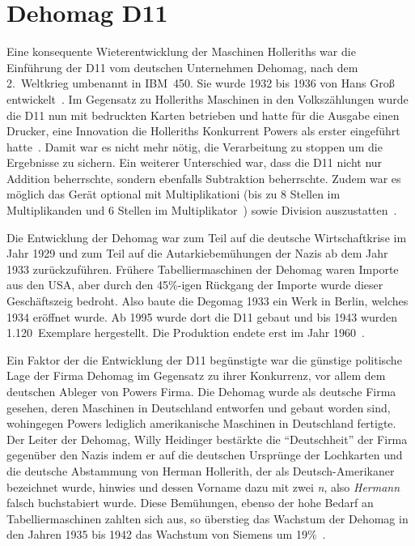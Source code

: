 \documentclass[parskip=half]{scrartcl}
\begin{document}
\section{Dehomag D11}
\label{sec:d11}

Eine konsequente Wieterentwicklung der Maschinen Holleriths war die Einführung
der D11 vom deutschen Unternehmen Dehomag, nach dem 2.~Weltkrieg umbenannt in
IBM~450. Sie wurde 1932 bis 1936 von Hans Groß
entwickelt~\cite{deutschesMuseum}. Im Gegensatz zu Holleriths Maschinen in den
Volkszählungen wurde die D11 nun mit bedruckten Karten betrieben und hatte für
die Ausgabe einen Drucker, eine Innovation die Holleriths Konkurrent Powers als
erster eingeführt hatte~\cite{austrian1982herman}. Damit war es nicht mehr
nötig, die Verarbeitung zu stoppen um die Ergebnisse zu sichern. Ein weiterer
Unterschied war, dass die D11 nicht nur Addition beherrschte, sondern ebenfalls
Subtraktion beherrschte. Zudem war es möglich das Gerät optional mit
Multiplikationi (bis zu 8 Stellen im Multiplikanden und 6 Stellen im
Multiplikator~\cite{rojas2002first}) sowie Division
auszustatten~\cite{deutschesMuseum}.

Die Entwicklung der Dehomag war zum Teil auf die deutsche Wirtschaftkrise im
Jahr 1929 und zum Teil auf die Autarkiebemühungen der Nazis ab dem Jahr 1933
zurückzuführen. Frühere Tabelliermaschinen der Dehomag waren Importe aus den
USA, aber durch den 45\%-igen Rückgang der Importe wurde dieser Geschäftszeig
bedroht. Also baute die Degomag 1933 ein Werk in Berlin, welches 1934 eröffnet
wurde. Ab 1995 wurde dort die D11 gebaut und bis 1943 wurden 1.120~Exemplare
hergestellt. Die Produktion endete erst im Jahr 1960~\cite{heide2009punched}.

Ein Faktor der die Entwicklung der D11 begünstigte war die günstige politische
Lage der Firma Dehomag im Gegensatz zu ihrer Konkurrenz, vor allem dem
deutschen Ableger von Powers Firma. Die Dehomag wurde als deutsche Firma
gesehen, deren Maschinen in Deutschland entworfen und gebaut worden sind,
wohingegen Powers lediglich amerikanische Maschinen in Deutschland fertigte.
Der Leiter der Dehomag, Willy Heidinger bestärkte die \enquote{Deutschheit} der
Firma gegenüber den Nazis indem er auf die deutschen Ursprünge der Lochkarten
und die deutsche Abstammung von Herman Hollerith, der als Deutsch-Amerikaner
bezeichnet wurde, hinwies und dessen Vorname dazu mit zwei \emph{n}, also
\emph{Hermann} falsch buchstabiert wurde. Diese Bemühungen, ebenso der hohe
Bedarf an Tabelliermaschinen zahlten sich aus, so überstieg das Wachstum der
Dehomag in den Jahren 1935 bis 1942 das Wachstum von Siemens um
19\%~\cite{heide2009punched}.
\end{document}
